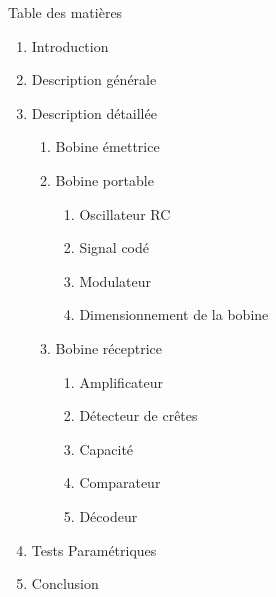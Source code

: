 \begin{frame}{Table des matières}
\begin{enumerate}
  \item Introduction
  \item Description générale
  \item Description détaillée
  \begin{enumerate}
    \item Bobine émettrice
    \item Bobine portable
    	\begin{enumerate}
		 \item Oscillateur RC
		 \item Signal codé
		 \item Modulateur
		 \item Dimensionnement de la bobine
		 \end{enumerate}
    \item Bobine réceptrice
    	\begin{enumerate}
		 \item Amplificateur
		 \item Détecteur de crêtes
		 \item Capacité
		 \item Comparateur
		 \item Décodeur
		 \end{enumerate}
  \end{enumerate}
  \item Tests Paramétriques
  \item Conclusion
\end{enumerate}
\end{frame}
